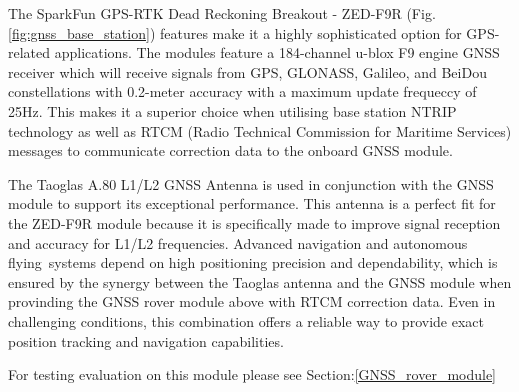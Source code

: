 \documentclass{report}
\begin{document}
The SparkFun GPS-RTK Dead Reckoning Breakout - ZED-F9R
(Fig.\ref{fig:gnss_base_station}) features make it a highly sophisticated option
for GPS-related applications. The modules feature a 184-channel u-blox F9 engine
GNSS receiver which will receive signals from GPS, GLONASS, Galileo, and BeiDou
constellations with 0.2-meter accuracy with a maximum update frequeccy of 25Hz.
This makes it a superior choice when utilising base station NTRIP technology as
well as RTCM (Radio Technical Commission for Maritime Services) messages to
communicate correction data to the onboard GNSS module.

The Taoglas A.80 L1/L2 GNSS Antenna is used in conjunction with the GNSS module
to support its exceptional performance. This antenna is a perfect fit for the
ZED-F9R module because it is specifically made to improve signal reception and
accuracy for L1/L2 frequencies. Advanced navigation and autonomous
flying systems depend on high positioning precision and dependability, which is
ensured by the synergy between the Taoglas antenna and the GNSS module when
provinding the GNSS rover module above with RTCM correction data. Even in
challenging conditions, this combination offers a reliable way to provide exact
position tracking and navigation capabilities.

For testing evaluation on this module please see Section:\ref{GNSS_rover_module}
\end{document}
